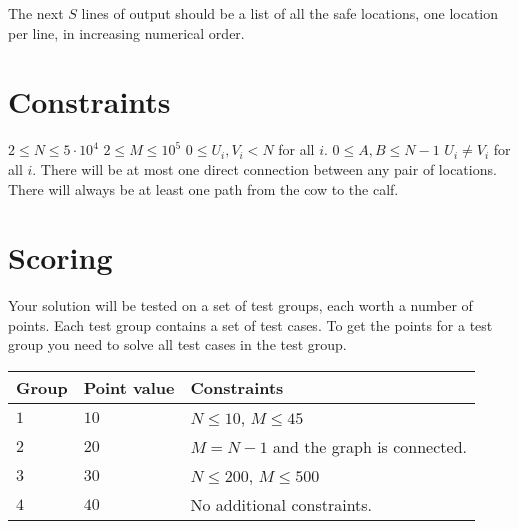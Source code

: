 The next $S$ lines of output should be a list of all the safe locations, 
one location per line, in increasing numerical order.

\section*{Constraints}
$2 \le N \le 5 \cdot 10^4$
\newline
$2 \le M \le 10^5$
\newline
$0 \le U_i, V_i < N$ for all $i$.
\newline
$0 \leq A,B \leq N-1$ 
\newline
$U_i \neq V_i$ for all $i$.
\newline
There will be at most one direct connection between any pair of locations.
\newline
There will always be at least one path from the cow to the calf.

\section*{Scoring}
Your solution will be tested on a set of test groups, each worth a number of points. 
Each test group contains a set of test cases. 
To get the points for a test group you need to solve all test cases in the test group.

\noindent
\begin{tabular}{| l | l | p{12cm} |}
  \hline
  \textbf{Group} & \textbf{Point value} & \textbf{Constraints} \\ \hline
  $1$    & $10$       & $N \le 10$, $M \le 45$  \\ \hline
  $2$    & $20$       & $M = N-1$ and the graph is connected. \\ \hline
  $3$    & $30$       & $N \le 200$, $M \le 500$ \\ \hline
  $4$    & $40$       & No additional constraints. \\ \hline
\end{tabular}

